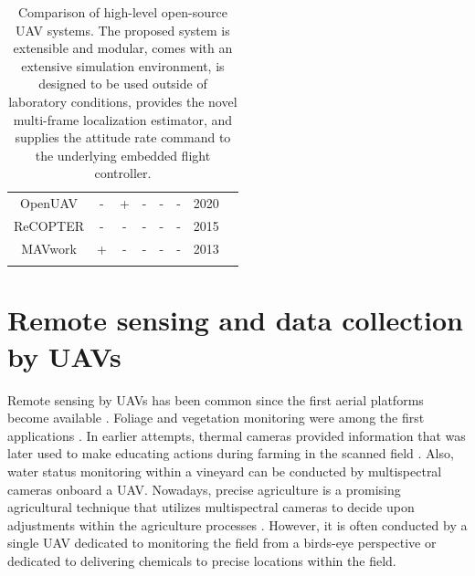 \documentclass[a4paper,11pt,twoside,openright]{book}
\begin{document}
\begin{table}
\begin{tabular}{c|c|c|c|c|c|c|c}
    \small OpenUAV                        & \small -                            & \small +          & \small -          & \small -                                 & \small -                                & \small 2020                                  & \small \cite{schmittle2018openuav}        \\
    \small ReCOPTER                       & \small -                            & \small -          & \small -          & \small -                                 & \small -                                & \small 2015                                  & \small \cite{abeywardena2015design}       \\
    \small MAVwork                        & \small +                            & \small -          & \small -          & \small -                                 & \small -                                & \small 2013                                  & \small \cite{mellado2013mavwork}          \\
\noalign{\smallskip}\hline
  \end{tabular}
  \caption{Comparison of high-level open-source \ac{UAV} systems. The proposed system is extensible and modular, comes with an extensive simulation environment, is designed to be used outside of laboratory conditions, provides the novel multi-frame localization estimator, and supplies the attitude rate command to the underlying embedded flight controller.\label{tab:uav_systems}}
\end{table}




\section{Remote sensing and data collection by UAVs}

Remote sensing by \acp{UAV} has been common since the first aerial platforms become available \cite{colomina2014unmanned, pajares2015overview}.
Foliage and vegetation monitoring were among the first applications \cite{barrientos2011aerial}.
In earlier attempts, thermal cameras provided information that was later used to make educating actions during farming in the scanned field \cite{berni2009thermal}.
Also, water status monitoring within a vineyard \cite{baluja2012assessment} can be conducted by multispectral cameras onboard a \ac{UAV}.
Nowadays, precise agriculture is a promising agricultural technique that utilizes multispectral cameras to decide upon adjustments within the agriculture processes \cite{fu2020wheat, zha2020improving, jang2020cost}.
However, it is often conducted by a single \ac{UAV} dedicated to monitoring the field from a birds-eye perspective or dedicated to delivering chemicals to precise locations within the field.
\end{document}
